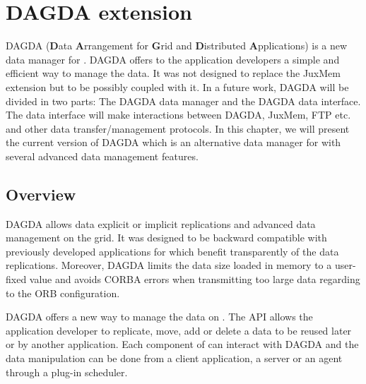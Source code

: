 \chapter{DAGDA extension}
\textsc{DAGDA} (\textbf{D}ata \textbf{A}rrangement for \textbf{G}rid and
\textbf{D}istributed \textbf{A}pplications) is a new data manager for \diet.
DAGDA offers  to the \diet application developers a simple and efficient way 
to manage the data. It was not designed to replace the JuxMem extension
but to be possibly coupled with it. In a future work, DAGDA will be
divided in two parts: The DAGDA data manager and the DAGDA data interface.
The data interface will make interactions between DAGDA, JuxMem, FTP
etc. and other data transfer/management protocols. In this chapter, we will
present the current version of DAGDA which is an alternative data manager
for \diet with several advanced data management features.
\section{Overview}
DAGDA allows data explicit or
implicit replications and advanced data management on the grid. It was
designed to be backward compatible with previously developed
applications for \diet which benefit transparently of the data
replications. Moreover, DAGDA limits the data size loaded in memory to
a user-fixed value and avoids CORBA errors when transmitting too large
data regarding to the ORB configuration.

DAGDA offers a new way to manage the data on \diet. The API allows the
application developer to replicate, move, add or delete a data to be
reused later or by another application. Each component of \diet can
interact with DAGDA and the data manipulation can be done from a
client application, a server or an agent through a plug-in
scheduler.

